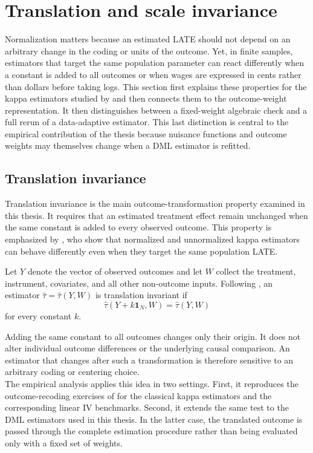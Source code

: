 \documentclass[12pt, a4paper, oneside]{article}
\theoremstyle{plain}
\theoremstyle{definition}
\begin{document}
\section{Translation and scale invariance}
\label{sec:translation_invariance}


Normalization matters because an estimated LATE should not depend on an arbitrary
change in the coding or units of the outcome. Yet, in finite samples, estimators that
target the same population parameter can react differently when a constant is added
to all outcomes or when wages are expressed in cents rather than dollars before taking
logs. This section first explains these properties for the kappa estimators studied by
\citet{sloczynski2025abadie} and then connects them to the outcome-weight
representation. It then distinguishes between a fixed-weight algebraic check and a
full rerun of a data-adaptive estimator. This last distinction is central to the empirical
contribution of the thesis because nuisance functions and outcome weights may
themselves change when a DML estimator is refitted.

\subsection{Translation invariance}
\label{subsec:translation_invariance}

\label{subsubsec:translation_outcome_weights}
Translation invariance is the main outcome-transformation property examined in this
thesis. It requires that an estimated treatment effect remain unchanged when the same
constant is added to every observed outcome. This property is emphasized by
\citet{sloczynski2025abadie}, who show that normalized and unnormalized kappa
estimators can behave differently even when they target the same population LATE.

Let \(Y\) denote the vector of observed outcomes and let \(W\) collect the treatment,
instrument, covariates, and all other non-outcome inputs. Following
\citet{sloczynski2025abadie}, an estimator
\(\widehat{\tau}=\widehat{\tau}(Y,W)\) is translation invariant if
\begin{equation}
    \widehat{\tau}(Y+k\mathbf 1_N,W)
    =
    \widehat{\tau}(Y,W)
    \label{eq:translation_definition}
\end{equation}
for every constant \(k\).

Adding the same constant to all outcomes changes only their origin. It does not alter
individual outcome differences or the underlying causal comparison. An estimator that
changes after such a transformation is therefore sensitive to an arbitrary coding or
centering choice.\\
The empirical analysis applies this idea in two settings. First, it reproduces the
outcome-recoding exercises of \citet{sloczynski2025abadie} for the classical kappa
estimators and the corresponding linear IV benchmarks. Second, it extends the same
test to the DML estimators used in this thesis. In the latter case, the translated outcome
is passed through the complete estimation procedure rather than being evaluated only
with a fixed set of weights.
\end{document}
